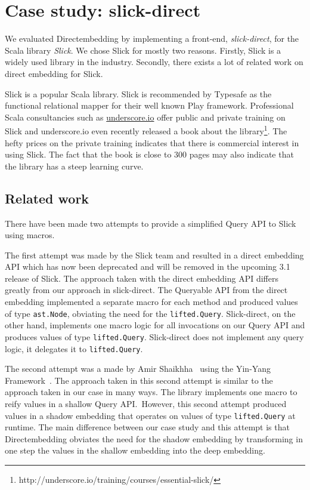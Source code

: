 \section{Case study: slick-direct} %
\label{sec:CaseStudy}
We evaluated Directembedding by implementing a front-end, \emph{slick-direct}, for the Scala library \emph{Slick}.
We chose Slick for mostly two reasons.
Firstly, Slick is a widely used library in the industry.
Secondly, there exists a lot of related work on direct embedding for Slick.

Slick is a popular Scala library.
Slick is recommended by Typesafe as the functional relational mapper for their well known Play framework.
Professional Scala consultancies such as \href{http://underscore.io}{underscore.io} offer public and private training on Slick and underscore.io even recently released a book about the library\footnote{http://underscore.io/training/courses/essential-slick/}.
The hefty prices on the private training indicates that there is commercial interest in using Slick.
The fact that the book is close to 300 pages may also indicate that the library has a steep learning curve.

\subsection{Related work} %
\label{sub:Relatedwork}
There have been made two attempts to provide a simplified Query API to Slick using macros.

\begin{sloppypar}
    
The first attempt was made by the Slick team and resulted in a direct embedding API which has now been deprecated and will be removed in the upcoming 3.1 release of Slick.
The approach taken with the direct embedding API differs greatly from our approach in slick-direct.
The Queryable API from the direct embedding implemented a separate macro for each method and produced values of type \texttt{ast.Node}, obviating the need for the \texttt{lifted.Query}.
Slick-direct, on the other hand, implements one macro logic for all invocations on our Query API and produces values of type \texttt{lifted.Query}.
Slick-direct does not implement any query logic, it delegates it to \texttt{lifted.Query}.
\end{sloppypar}

The second attempt was a made by Amir Shaikhha~\autocite{shaikhha_embedded_2014} using the Yin-Yang Framework~\autocite{jovanovic_yin-yang:_2014}.
The approach taken in this second attempt is similar to the approach taken in our case in many ways.
The library implements one macro to reify values in a shallow Query API.\
However, this second attempt produced values in a shadow embedding that operates on values of type \texttt{lifted.Query} at runtime.
The main difference between our case study and this attempt is that Directembedding obviates the need for the shadow embedding by transforming in one step the values in the shallow embedding into the deep embedding.

